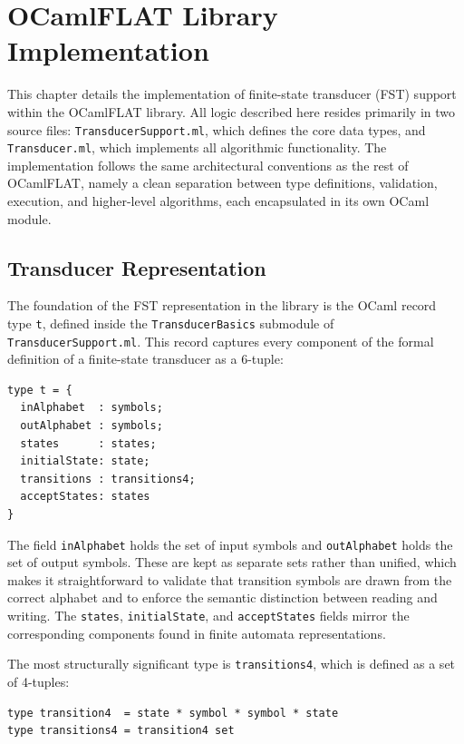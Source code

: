 %

\chapter{OCamlFLAT Library Implementation}
\label{cha:transducer-implementation}

This chapter details the implementation of finite-state transducer (FST) support within the OCamlFLAT library. 
All logic described here resides primarily in two source files: 
\texttt{TransducerSupport.ml}, which defines the core data types, 
and \texttt{Transducer.ml}, which implements all algorithmic functionality. 
The implementation follows the same architectural conventions as the rest of OCamlFLAT, 
namely a clean separation between type definitions, validation, execution, and higher-level algorithms, 
each encapsulated in its own OCaml module.

\section{Transducer Representation}
\label{sec:back_representation}

The foundation of the FST representation in the library is the OCaml record type \texttt{t}, 
defined inside the \texttt{TransducerBasics} submodule of \texttt{TransducerSupport.ml}. 
This record captures every component of the formal definition of a finite-state transducer as a 6-tuple:

\begin{verbatim}
type t = {
  inAlphabet  : symbols;
  outAlphabet : symbols;
  states      : states;
  initialState: state;
  transitions : transitions4;
  acceptStates: states
}
\end{verbatim}

The field \texttt{inAlphabet} holds the set of input symbols and \texttt{outAlphabet} 
holds the set of output symbols. These are kept as separate sets rather than unified, 
which makes it straightforward to validate that transition symbols are drawn from the correct alphabet and to enforce the 
semantic distinction between reading and writing. The \texttt{states}, \texttt{initialState}, and \texttt{acceptStates} 
fields mirror the corresponding components found in finite automata representations.

The most structurally significant type is \texttt{transitions4}, which is defined as a set of 4-tuples:

\begin{verbatim}
type transition4  = state * symbol * symbol * state
type transitions4 = transition4 set
\end{verbatim}

